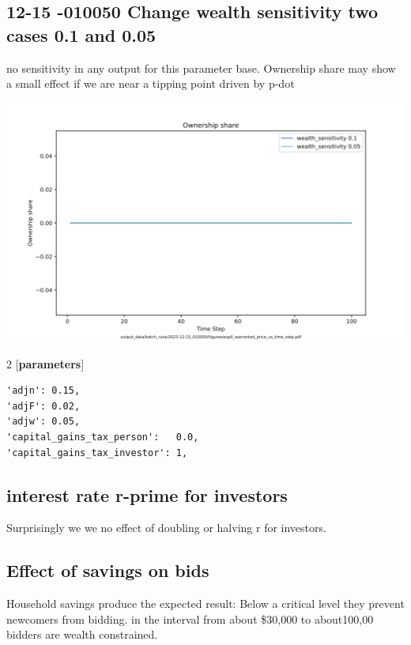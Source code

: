 \documentclass{article}
\begin{document}




\subsection{12-15 -010050 Change wealth sensitivity two cases 0.1 and 0.05 }
no sensitivity in any output for this parameter base. Ownership share may show  a small effect if we are near a tipping point driven by p-dot

\includegraphics[scale=.45]{fig/Analysis/exp0_warranted_price_vs_time_step.png}


\begin{multicols}{2}
[\textbf{parameters}]
\begin{verbatim}
'adjn': 0.15,
'adjF': 0.02,
'adjw': 0.05, 
'capital_gains_tax_person':   0.0,
'capital_gains_tax_investor': 1,
\end{verbatim}

\end{multicols}


\subsection{interest rate r-prime for investors}
Surprisingly we we no effect of doubling or halving r for investors.


\subsection{Effect  of savings on bids}
Household savings produce the expected result: Below a critical level they prevent newcomers from bidding. in the interval from about \$30,000 to about100,00 bidders are wealth constrained. 
\end{document}
